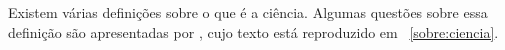 
Existem várias definições sobre o que é a ciência. Algumas questões sobre essa definição são apresentadas por \citep{fernandes_consideracoes_2021}, cujo texto está reproduzido em ~\ref{sobre:ciencia}. 


